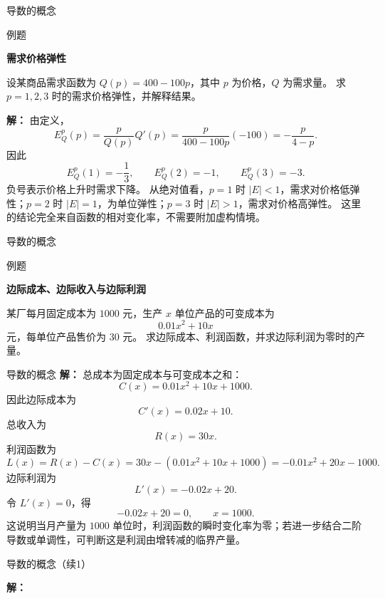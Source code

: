 \documentclass[aspectratio=169,10pt,fontset=fandol]{ctexbeamer}
\begin{document}
\begin{frame}[t,fragile]{导数的概念}
\normalsize
\begin{block}{例题}
{\normalsize
\textbf{需求价格弹性}\par

设某商品需求函数为 $Q(p)=400-100p$，其中 $p$ 为价格，$Q$ 为需求量。 求 $p=1,2,3$ 时的需求价格弹性，并解释结果。

}
\end{block}
\pause
{\normalsize
\textbf{解：}
由定义，
\[
E_Q^p(p)=\frac{p}{Q(p)}Q'(p)=\frac{p}{400-100p}(-100)=-\frac{p}{4-p}.
\]
因此
\[
E_Q^p(1)=-\frac13,\qquad E_Q^p(2)=-1,\qquad E_Q^p(3)=-3.
\]
负号表示价格上升时需求下降。 从绝对值看，$p=1$ 时 $|E|<1$，需求对价格低弹性；$p=2$ 时 $|E|=1$，为单位弹性；$p=3$ 时 $|E|>1$，需求对价格高弹性。 这里的结论完全来自函数的相对变化率，不需要附加虚构情境。

}
\end{frame}
\begin{frame}[t,fragile]{导数的概念}
\normalsize
\begin{block}{例题}
{\normalsize
\textbf{边际成本、边际收入与边际利润}\par

某厂每月固定成本为 $1000$ 元，生产 $x$ 单位产品的可变成本为
\[
0.01x^2+10x
\]
元，每单位产品售价为 $30$ 元。 求边际成本、利润函数，并求边际利润为零时的产量。

}
\end{block}
\end{frame}
\begin{frame}[t,fragile]{导数的概念}
\footnotesize
{\footnotesize
\textbf{解：}
总成本为固定成本与可变成本之和：
\[
C(x)=0.01x^2+10x+1000.
\]
因此边际成本为
\[
C'(x)=0.02x+10.
\]
总收入为
\[
R(x)=30x.
\]
利润函数为
\[
L(x)=R(x)-C(x)=30x-(0.01x^2+10x+1000)
=-0.01x^2+20x-1000.
\]
边际利润为
\[
L'(x)=-0.02x+20.
\]
令 $L'(x)=0$，得
\[
-0.02x+20=0,\qquad x=1000.
\]
这说明当月产量为 $1000$ 单位时，利润函数的瞬时变化率为零；若进一步结合二阶导数或单调性，可判断这是利润由增转减的临界产量。
}
\end{frame}
\begin{frame}[t,fragile]{导数的概念（续1）}
\normalsize
{\normalsize
\textbf{解：}


}
\end{frame}
\end{document}
